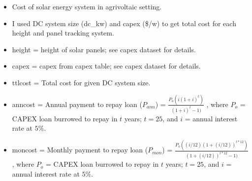 \documentclass[
  letterpaper,
  DIV=11,
  numbers=noendperiod]{scrartcl}
\begin{document}
\begin{itemize}
\item
  Cost of solar energy system in agrivoltaic setting.
\item
  I used DC system size (dc\_kw) and capex (\$/w) to get total cost for
  each height and panel tracking system.
\item
  height = height of solar panels; see capex dataset for details.
\item
  capex = capex from capex table; see capex dataset for details.
\item
  ttlcost = Total cost for given DC system size.
\item
  anncost = Annual payment to repay loan (\(P_{ann}\)) =
  \(\frac{P_o(i(1 + i)^t)}{(1+i)^t - 1)}\) , where \(P_o\) = CAPEX loan
  burrowed to repay in \(t\) years; \(t = 25\), and \(i\) = annual
  interest rate at \(5\%\).
\item
  moncost = Monthly payment to repay loan (\(P_{mon}\)) =
  \(\frac{P_o((i/12)(1 + (i/12))^{t*12})}{(1+(i/12))^{t*12} - 1)}\),
  where \(P_o\) = CAPEX loan burrowed to repay in \(t\) years;
  \(t = 25\), and \(i\) = annual interest rate at \(5\%\).
\end{itemize}
\end{document}
